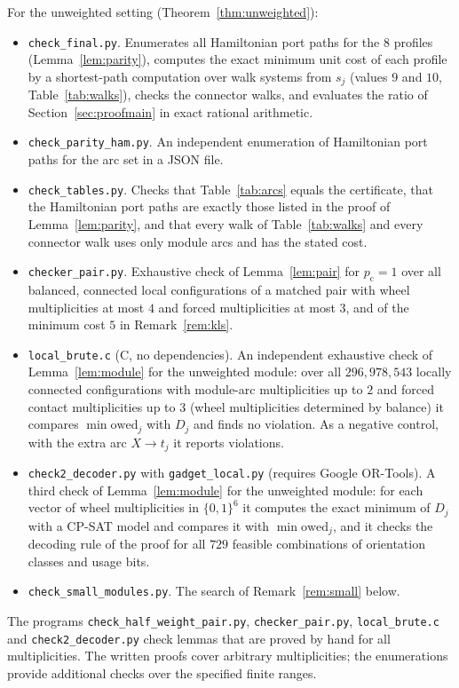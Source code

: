 \documentclass[11pt]{amsart}
\theoremstyle{definition}
\theoremstyle{remark}
\numberwithin{equation}{section}
\newcommand{\owed}{\mathrm{owed}}
\newcommand{\pc}{p_{\mathrm{c}}}
\begin{document}
For the unweighted setting (Theorem~\ref{thm:unweighted}):
\begin{itemize}[leftmargin=2em]
\item \texttt{check\_final.py}. Enumerates all Hamiltonian port paths for the $8$ profiles (Lemma~\ref{lem:parity}), computes the exact minimum unit cost of each profile by a shortest-path computation over walk systems from $s_j$ (values $9$ and $10$, Table~\ref{tab:walks}), checks the connector walks, and evaluates the ratio of Section~\ref{sec:proofmain} in exact rational arithmetic.
\item \texttt{check\_parity\_ham.py}. An independent enumeration of Hamiltonian port paths for the arc set in a JSON file.
\item \texttt{check\_tables.py}. Checks that Table~\ref{tab:arcs} equals the certificate, that the Hamiltonian port paths are exactly those listed in the proof of Lemma~\ref{lem:parity}, and that every walk of Table~\ref{tab:walks} and every connector walk uses only module arcs and has the stated cost.
\item \texttt{checker\_pair.py}. Exhaustive check of Lemma~\ref{lem:pair} for $\pc=1$ over all balanced, connected local configurations of a matched pair with wheel multiplicities at most $4$ and forced multiplicities at most $3$, and of the minimum cost $5$ in Remark~\ref{rem:kls}.
\item \texttt{local\_brute.c} (C, no dependencies). An independent exhaustive check of Lemma~\ref{lem:module} for the unweighted module: over all $296{,}978{,}543$ locally connected configurations with module-arc multiplicities up to $2$ and forced contact multiplicities up to $3$ (wheel multiplicities determined by balance) it compares $\min\owed_j$ with $D_j$ and finds no violation. As a negative control, with the extra arc $X\to t_j$ it reports violations.
\item \texttt{check2\_decoder.py} with \texttt{gadget\_local.py} (requires Google OR-Tools). A third check of Lemma~\ref{lem:module} for the unweighted module: for each vector of wheel multiplicities in $\{0,1\}^6$ it computes the exact minimum of $D_j$ with a CP-SAT model and compares it with $\min\owed_j$, and it checks the decoding rule of the proof for all $729$ feasible combinations of orientation classes and usage bits.
\item \texttt{check\_small\_modules.py}. The search of Remark~\ref{rem:small} below.
\end{itemize}
The programs \texttt{check\_half\_weight\_pair.py}, \texttt{checker\_pair.py}, \texttt{local\_brute.c} and \texttt{check2\_\allowbreak decoder.py} check lemmas that are proved by hand for all multiplicities. The written proofs cover arbitrary multiplicities; the enumerations provide additional checks over the specified finite ranges.
\end{document}
